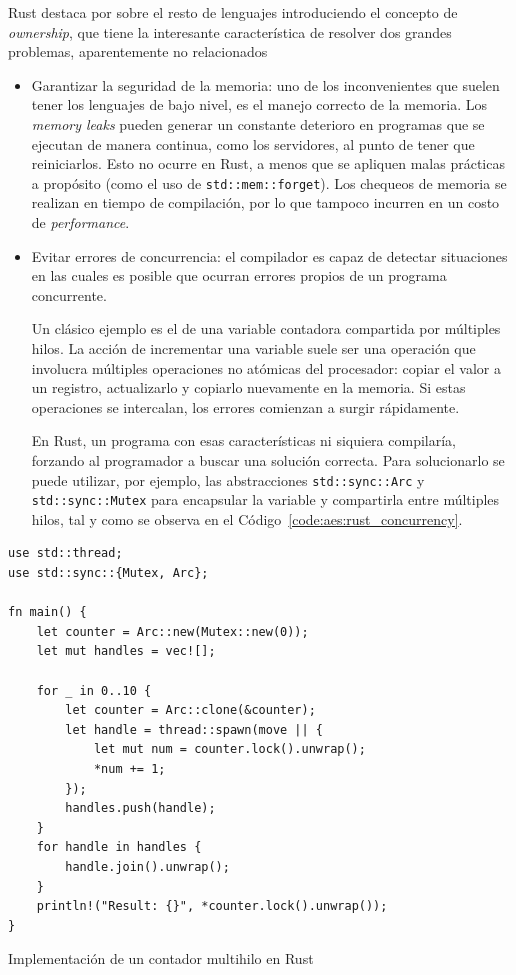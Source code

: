 \documentclass[11pt]{article}
\newcommand{\english}[1]{\textit{#1}}
\begin{document}
Rust destaca por sobre el resto de lenguajes introduciendo el concepto de \english{ownership}, que tiene la interesante característica de resolver dos grandes problemas, aparentemente no relacionados

\begin{itemize}
    \item Garantizar la seguridad de la memoria: uno de los inconvenientes que suelen tener los lenguajes de bajo nivel, es el manejo correcto de la memoria. Los \english{memory leaks} pueden generar un constante deterioro en programas que se ejecutan de manera continua, como los servidores, al punto de tener que reiniciarlos. Esto no ocurre en Rust, a menos que se apliquen malas prácticas a propósito (como el uso de \lstinline{std::mem::forget}). Los chequeos de memoria se realizan en tiempo de compilación, por lo que tampoco incurren en un costo de \english{performance}.
    \item Evitar errores de concurrencia: el compilador es capaz de detectar situaciones en las cuales es posible que ocurran errores propios de un programa concurrente.
    
    Un clásico ejemplo es el de una variable contadora compartida por múltiples hilos. La acción de incrementar una variable suele ser una operación que involucra múltiples operaciones no atómicas del procesador: copiar el valor a un registro, actualizarlo y copiarlo nuevamente en la memoria. Si estas operaciones se intercalan, los errores comienzan a surgir rápidamente.
    
    En Rust, un programa con esas características ni siquiera compilaría, forzando al programador a buscar una solución correcta. Para solucionarlo se puede utilizar, por ejemplo, las abstracciones \lstinline{std::sync::Arc} y \lstinline{std::sync::Mutex} para encapsular la variable y compartirla entre múltiples hilos, tal y como se observa en el Código~\ref{code:aes:rust_concurrency}.
\end{itemize}

\begin{listing}[h]
\begin{verbatim}
use std::thread;
use std::sync::{Mutex, Arc};

fn main() {
    let counter = Arc::new(Mutex::new(0));
    let mut handles = vec![];

    for _ in 0..10 {
        let counter = Arc::clone(&counter);
        let handle = thread::spawn(move || {
            let mut num = counter.lock().unwrap();
            *num += 1;
        });
        handles.push(handle);
    }
    for handle in handles {
        handle.join().unwrap();
    }
    println!("Result: {}", *counter.lock().unwrap());
}
\end{verbatim}
\caption{Implementación de un contador multihilo en Rust}
\label{code:aes:rust_concurrency}
\end{listing}
\end{document}
